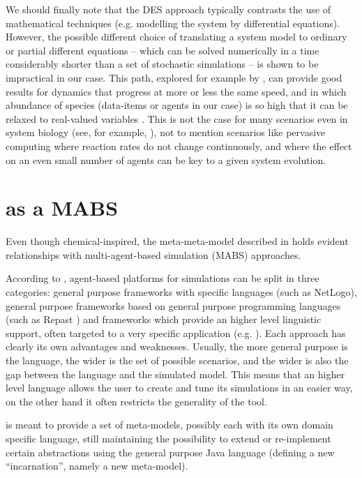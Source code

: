 \documentclass[12pt,a4paper,twoside,openright]{book}
\begin{document}
We should finally note that the DES approach typically contrasts the use of mathematical techniques (e.g. modelling the system by differential equations).
%
However, the possible different choice of translating a system model to ordinary or partial different equations -- which can be solved numerically in a time considerably shorter than a set of stochastic simulations -- is shown to be impractical in our case.
%
This path, explored for example by \cite{MallavarapuInterface2008}, can provide good results for dynamics that progress at more or less the same speed, and in which abundance of species (data-items or agents in our case) is so high that it can be relaxed to real-valued variables \cite{EwaldJOS2007}.
%
This is not the case for many scenarios even in system biology (see, for example, \cite{Cowan2000, UhrmacherWSC2005}), not to mention scenarios like pervasive computing where reaction rates do not change continuously, and where the effect on an even small number of agents can be key to a given system evolution.

\section{\alchemist{} as a MABS}

Even though chemical-inspired, the meta-meta-model described in  holds evident relationships with multi-agent-based simulation (MABS) approaches.

According to \cite{BandiniJASSS2009}, agent-based platforms for simulations can be split in three categories: general purpose frameworks with specific languages (such as NetLogo), general purpose frameworks based on general purpose programming languages (such as Repast \cite{repast}) and frameworks which provide an higher level linguistic support, often targeted to a very specific application (e.g. \cite{WeynsAAMAS2006}).
%
Each approach has clearly its own advantages and weaknesses.
%
Usually, the more general purpose is the language, the wider is the set of possible scenarios, and the wider is also the gap between the language and the simulated model.
%
This means that an higher level language allows the user to create and tune its simulations in an easier way, on the other hand it often restricts the generality of the tool. 

\alchemist{} is meant to provide a set of meta-models, possibly each with its own domain specific language, still maintaining the possibility to extend or re-implement certain abstractions using the general purpose Java language (defining a new ``incarnation'', namely a new meta-model).
\end{document}

